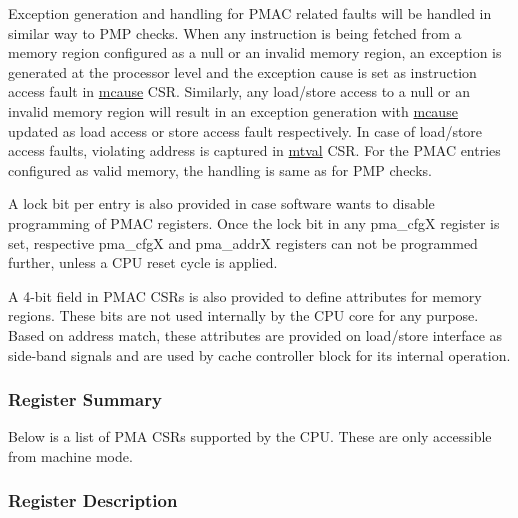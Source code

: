 \documentclass[main\_\_EN.tex]{subfiles}
\begin{document}
Exception generation and handling for PMAC related faults will be handled in similar way to PMP checks. When any instruction is being fetched from a memory region configured as a null or an invalid memory region, an exception is generated at the processor level and the exception cause is set as instruction access fault in \hyperref[regdesc:MCAUSE]{mcause} CSR. Similarly, any load/store access to a null or an invalid memory region will result in an exception generation with \hyperref[regdesc:MCAUSE]{mcause} updated as load access or store access fault respectively. In case of load/store access faults, violating address is captured in \hyperref[regdesc:MTVAL]{mtval} CSR. For the PMAC entries configured as valid memory, the handling is same as for PMP checks.

A lock bit per entry is also provided in case software wants to disable programming of PMAC registers. Once the lock bit in any pma\_cfgX register is set, respective pma\_cfgX and pma\_addrX registers can not be programmed further, unless a CPU reset cycle is applied.

A 4-bit field in PMAC CSRs is also provided to define attributes for memory regions. These bits are not used internally by the CPU core for any purpose. Based on address match, these attributes are provided on load/store interface as side-band signals and are used by cache controller block for its internal operation.


\newpage
\hypertarget{riscvcpu-pma-reg-summ}{}
\subsubsection{Register Summary}
\label{sec:riscvcpu-pma-reg-summ}

Below is a list of PMA CSRs supported by the CPU. These are only accessible from machine mode.




\subsubsection{Register Description}
\label{sec:riscvcpu-pma-reg-desc}



\newpage
\end{document}
